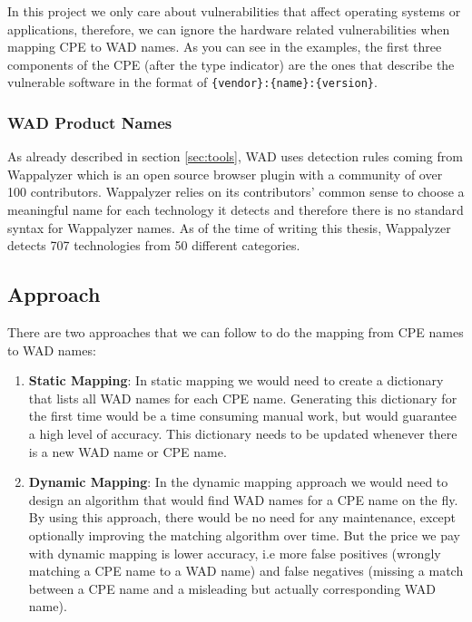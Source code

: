 In this project we only care about vulnerabilities that affect operating systems or applications, therefore, we can ignore the hardware related vulnerabilities when mapping CPE to WAD names. As you can see in the examples, the first three components of the CPE (after the type indicator) are the ones that describe the vulnerable software in the format of \texttt{\{vendor\}:\{name\}:\{version\}}.
 

\subsubsection{WAD Product Names}
As already described in section \ref{sec:tools}, WAD uses detection rules coming from Wappalyzer which is an open source browser plugin with a community of over 100 contributors. Wappalyzer relies on its contributors' common sense to choose a meaningful name for each technology it detects and therefore there is no standard syntax for Wappalyzer names. As of the time of writing this thesis, Wappalyzer detects 707 technologies from 50 different categories.


\subsection{Approach}

There are two approaches that we can follow to do the mapping from CPE names to WAD names:
\begin{enumerate}
\item \textbf{Static Mapping}: In static mapping we would need to create a dictionary that lists all WAD names for each CPE name. Generating this dictionary for the first time would be a time consuming manual work, but would guarantee a high level of accuracy. This dictionary needs to be updated whenever there is a new WAD name or CPE name. 
\item \textbf{Dynamic Mapping}: In the dynamic mapping approach we would need to design an algorithm that would find WAD names for a CPE name on the fly. By using this approach, there would be no need for any maintenance, except optionally improving the matching algorithm over time. But the price we pay with dynamic mapping is lower accuracy, i.e more false positives (wrongly matching a CPE name to a WAD name) and false negatives (missing a match between a CPE name and a misleading but actually corresponding WAD name).  
\end{enumerate} 



